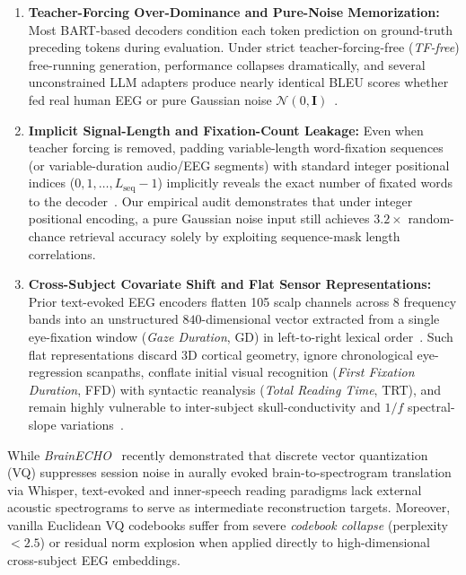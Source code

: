 \documentclass[journal]{IEEEtran}
\begin{document}
\begin{enumerate}
    \item \textbf{Teacher-Forcing Over-Dominance and Pure-Noise Memorization:} Most BART-based decoders condition each token prediction on ground-truth preceding tokens during evaluation. Under strict teacher-forcing-free (\textit{TF-free}) free-running generation, performance collapses dramatically, and several unconstrained LLM adapters produce nearly identical BLEU scores whether fed real human EEG or pure Gaussian noise $\mathcal{N}(0, \mathbf{I})$~\cite{jo2024are, li2025brainecho}.
    \item \textbf{Implicit Signal-Length and Fixation-Count Leakage:} Even when teacher forcing is removed, padding variable-length word-fixation sequences (or variable-duration audio/EEG segments) with standard integer positional indices ($0, 1, \dots, L_{\text{seq}}-1$) implicitly reveals the exact number of fixated words to the decoder~\cite{li2025brainecho}. Our empirical audit demonstrates that under integer positional encoding, a pure Gaussian noise input still achieves $3.2\times$ random-chance retrieval accuracy solely by exploiting sequence-mask length correlations.
    \item \textbf{Cross-Subject Covariate Shift and Flat Sensor Representations:} Prior text-evoked EEG encoders flatten 105 scalp channels across 8 frequency bands into an unstructured $840$-dimensional vector extracted from a single eye-fixation window (\textit{Gaze Duration}, GD) in left-to-right lexical order~\cite{wang2022open, wang2024cetmae}. Such flat representations discard 3D cortical geometry, ignore chronological eye-regression scanpaths, conflate initial visual recognition (\textit{First Fixation Duration}, FFD) with syntactic reanalysis (\textit{Total Reading Time}, TRT), and remain highly vulnerable to inter-subject skull-conductivity and $1/f$ spectral-slope variations~\cite{song2024eegmacs}.
\end{enumerate}

While \textit{BrainECHO}~\cite{li2025brainecho} recently demonstrated that discrete vector quantization (VQ) suppresses session noise in aurally evoked brain-to-spectrogram translation via Whisper, text-evoked and inner-speech reading paradigms lack external acoustic spectrograms to serve as intermediate reconstruction targets. Moreover, vanilla Euclidean VQ codebooks suffer from severe \textit{codebook collapse} (perplexity $< 2.5$) or residual norm explosion when applied directly to high-dimensional cross-subject EEG embeddings.
\end{document}
